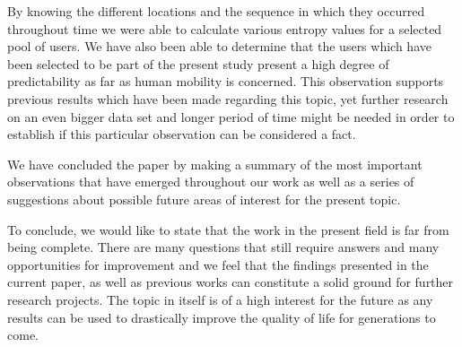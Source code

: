 By knowing the different locations and the sequence in which they occurred
throughout time we were able to calculate various entropy values for a selected
pool of users. We have also been able to determine that the users which have
been selected to be part of the present study present a high degree of
predictability as far as human mobility is concerned. This observation supports
previous results which have been made regarding this topic, yet further research
on an even bigger data set and longer period of time might be needed in order to
establish if this particular observation can be considered a fact.

We have concluded the paper by making a summary of the most important
observations that have emerged throughout our work as well as a series of
suggestions about possible future areas of interest for the present topic.

To conclude, we would like to state that the work in the present field is far
from being complete. There are many questions that still require answers and
many opportunities for improvement and we feel that the findings presented in
the current paper, as well as previous works can constitute a solid ground for
further research projects. The topic in itself is of a high interest for the
future as any results can be used to drastically improve the quality of life for
generations to come.
